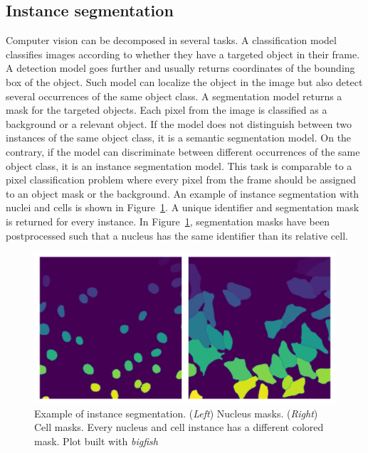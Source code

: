 \subsection{Instance segmentation}
\label{subsec:segmentation_instance_introduction}

Computer vision can be decomposed in several tasks.
A classification model classifies images according to whether they have a targeted object in their frame.
A detection model goes further and usually returns coordinates of the bounding box of the object.
Such model can localize the object in the image but also detect several occurrences of the same object class.
A segmentation model returns a mask for the targeted objects.
Each pixel from the image is classified as a background or a relevant object.
If the model does not distinguish between two instances of the same object class, it is a semantic segmentation model.
On the contrary, if the model can discriminate between different occurrences of the same object class, it is an instance segmentation model.
This task is comparable to a pixel classification problem where every pixel from the frame should be assigned to an object mask or the background.
An example of instance segmentation with nuclei and cells is shown in Figure~\ref{fig:instance_segmentation_example}.
A unique identifier and segmentation mask is returned for every instance.
In Figure~\ref{fig:instance_segmentation_example}, segmentation masks have been postprocessed such that a nucleus has the same identifier than its relative cell.

\begin{figure}[]
    \centering
    \includegraphics[width=\textwidth]{figures/chapter3/instance_segmentation}
    \caption[Example of instance segmentation]{Example of instance segmentation.
	(\textit{Left}) Nucleus masks.
	(\textit{Right}) Cell masks.
	Every nucleus and cell instance has a different colored mask.
	Plot built with \emph{bigfish}}
    \label{fig:instance_segmentation_example}
\end{figure}

